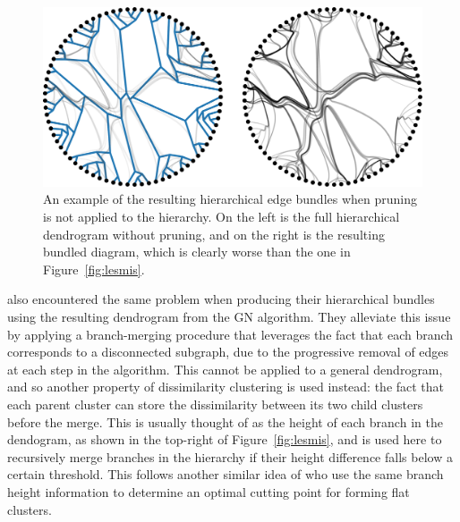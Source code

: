 \begin{figure}
  \centering
  \includegraphics[width=.9\textwidth]{power/pruning.pdf}
  \caption[Hierarchical edge bundles without pruning]{An example of the resulting hierarchical edge bundles when pruning is not applied to the hierarchy. On the left is the full hierarchical dendrogram without pruning, and on the right is the resulting bundled diagram, which is clearly worse than the one in Figure~\ref{fig:lesmis}.}
  \label{fig:pruning}   
\end{figure}

\citet{Jia2011} also encountered the same problem when producing their hierarchical bundles using the resulting dendrogram from the GN algorithm. They alleviate this issue by applying a branch-merging procedure that leverages the fact that each branch corresponds to a disconnected subgraph, due to the progressive removal of edges at each step in the algorithm.
This cannot be applied to a general dendrogram, and so another property of dissimilarity clustering is used instead: the fact that each parent cluster can store the dissimilarity between its two child clusters before the merge. This is usually thought of as the height of each branch in the dendogram, as shown in the top-right of Figure~\ref{fig:lesmis}, and is used here to recursively merge branches in the hierarchy if their height difference falls below a certain threshold. This follows another similar idea of \citet{Pons2006} who use the same branch height information to determine an optimal cutting point for forming flat clusters.

